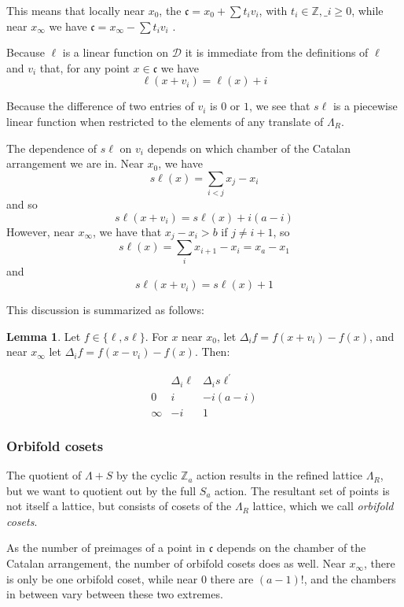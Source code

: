 \documentclass{amsart}[12pt]
\theoremstyle{definition}
\newtheorem{lemma}[dummy]{Lemma}
\newcommand{\Z}{\mathbb{Z}}
\newcommand{\sk}{s\ell}
\newcommand{\cone}{\mathfrak{c}}
\newcommand{\polyh}{\mathfrak{c}}
\newcommand{\dominant}{\mathcal{D}}
\begin{document}
This means that locally near $x_0$, the $\polyh=x_0+\sum t_i v_i$, with $t_i\in\Z, \_i\geq 0$, while near $x_\infty$ we have $\cone=x_\infty-\sum t_iv_i$ .

Because $\ell$ is a linear function on $\dominant$ it is immediate from the definitions of $\ell$ and $v_i$ that, for any point $x\in\cone$ we have  
$$\ell(x+v_i)=\ell(x)+i$$

Because the difference of two entries of $v_i$ is $0$ or $1$, we see that $\sk$ is a piecewise linear function when restricted to the elements of any translate of $\Lambda_R$.

The dependence of $\sk$ on $v_i$ depends on which chamber of the Catalan arrangement we are in.  Near $x_0$, we have $$\sk(x)=\sum_{i<j} x_j-x_i$$ and so
$$\sk(x+v_i) = \sk(x)+i(a-i)$$
However, near $x_\infty$, we have that $x_j-x_i>b$ if $j\neq i+1$, so 
$$\sk(x)=\sum_i x_{i+1}-x_i=x_a-x_1$$ and
$$\sk(x+v_i)=\sk(x)+1$$

This discussion is summarized as follows:

\begin{lemma} \label{lem:table}
Let $f\in\{\ell,\sk\}$.  For $x$ near $x_0$, let $\Delta_if=f(x+v_i)-f(x)$, and near $x_\infty$ let $\Delta_if=f(x-v_i)-f(x)$.  Then:

$$\begin{array}{r|cc}
 & \Delta_i\ell & \Delta_i\sk^\prime \\
\hline
0 & i & -i(a-i) \\
\infty & -i & 1
\end{array}
$$
\end{lemma}


\subsubsection{Orbifold cosets}

The quotient of $\Lambda+S$ by the cyclic $\Z_a$ action results in the refined lattice $\Lambda_R$, but we want to quotient out by the full $S_a$ action.  The resultant set of points is not itself a lattice, but consists of cosets of the $\Lambda_R$ lattice, which we call \emph{orbifold cosets}.  

As the number of preimages of a point in $\polyh$ depends on the chamber of the Catalan arrangement, the number of orbifold cosets does as well. Near $x_{\infty}$, there is only be one orbifold coset, while near $0$ there are $(a-1)!$, and the chambers in between vary between these two extremes.   
\end{document}
